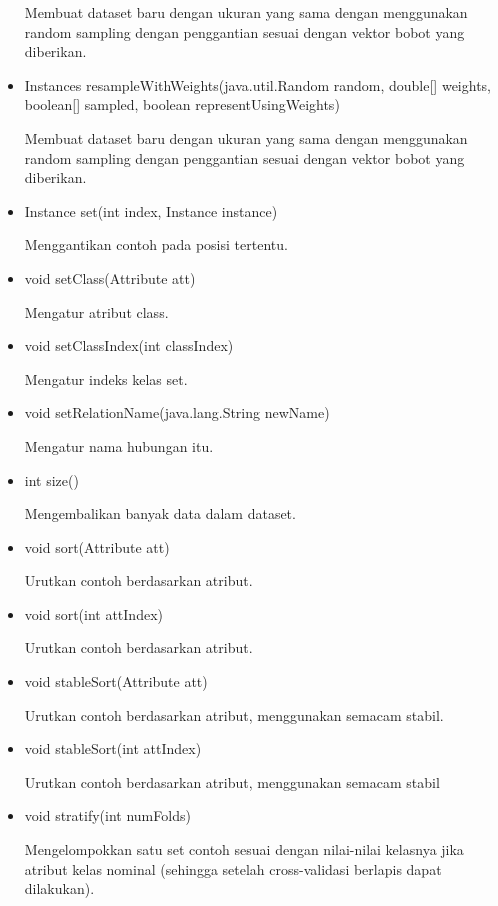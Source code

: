 \begin{itemize}
	Membuat dataset baru dengan ukuran yang sama dengan menggunakan random sampling dengan penggantian sesuai dengan vektor bobot yang diberikan.
	
	\item Instances resampleWithWeights(java.util.Random random, double[] weights, boolean[] sampled, boolean representUsingWeights)
	
	Membuat dataset baru dengan ukuran yang sama dengan menggunakan random sampling dengan penggantian sesuai dengan vektor bobot yang diberikan.

	\item Instance set(int index, Instance instance)

	Menggantikan contoh pada posisi tertentu.
	
	\item void setClass(Attribute att)
	
	Mengatur atribut class.
	
	\item void setClassIndex(int classIndex)
	
	Mengatur indeks kelas set.
	
	\item void setRelationName(java.lang.String newName)
	
	Mengatur nama hubungan itu.
	
	\item int size()
	
	Mengembalikan banyak data dalam dataset.
	
	\item void sort(Attribute att)
	
	Urutkan contoh berdasarkan atribut.
	
	\item void sort(int attIndex)
	
	Urutkan contoh berdasarkan atribut.
	
	\item void stableSort(Attribute att)
	
	Urutkan contoh berdasarkan atribut, menggunakan semacam stabil.
	
	\item void stableSort(int attIndex)
	
	Urutkan contoh berdasarkan atribut, menggunakan semacam stabil
	
	\item void stratify(int numFolds)
	
	Mengelompokkan satu set contoh sesuai dengan nilai-nilai kelasnya jika atribut kelas nominal (sehingga setelah cross-validasi berlapis dapat dilakukan).
	

\end{itemize}
